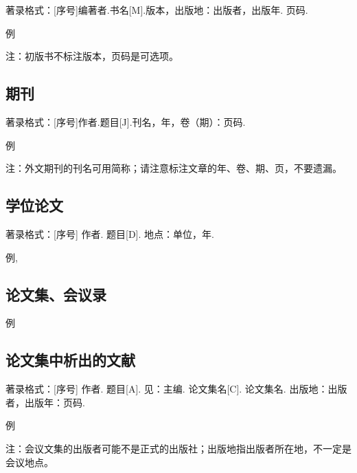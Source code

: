 著录格式：[序号]编著者.书名[M].版本，出版地：出版者，出版年. 页码.

例\cite{Liu:88} \cite{Isidori:89}

\printbibliography[type=book,title=专著（含教材）格式示例,notkeyword=standard,heading=subbibliography]

注：初版书不标注版本，页码是可选项。

\subsection{期刊}

著录格式：[序号]作者.题目[J].刊名，年，卷（期）：页码.

例\cite{Fu:2000} \cite{Moustafa:95}

\printbibliography[type=article,title=期刊格式示例,heading=subbibliography]

注：外文期刊的刊名可用简称；请注意标注文章的年、卷、期、页，不要遗漏。

\subsection{学位论文}

著录格式：[序号]  作者. 题目[D]. 地点：单位，年.

例\cite{Zhu:96}, \cite{Sun:83}

\printbibliography[type=thesis,title=学位论文格式示例,heading=subbibliography]

\subsection{论文集、会议录}

例\cite{Xin:84} \cite{Bei:97}

\printbibliography[type=proceedings,title=论文集、会议录格式示例,heading=subbibliography]

\subsection{论文集中析出的文献}

著录格式：[序号]  作者. 题目[A]. 见：主编. 论文集名[C]. 论文集名. 出版地：出版者，出版年：页码.

例\cite{Chen:97} \cite{Peng:97}

\printbibliography[type=inproceedings,title=论文集中析出的文献格式示例,heading=subbibliography]

注：会议文集的出版者可能不是正式的出版社；出版地指出版者所在地，不一定是会议地点。

